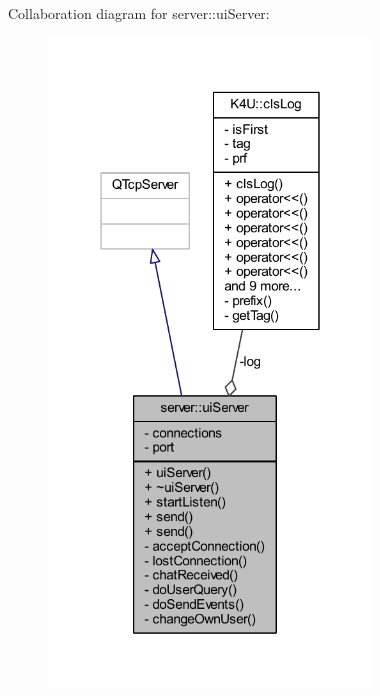 Collaboration diagram for server\-:\-:ui\-Server\-:\nopagebreak
\begin{figure}[H]
\begin{center}
\leavevmode
\includegraphics[width=243pt]{df/dd7/classserver_1_1ui_server__coll__graph}
\end{center}
\end{figure}
